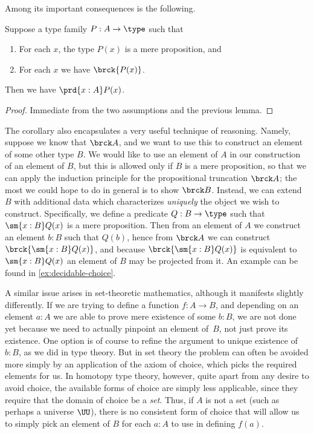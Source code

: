 Among its important consequences is the following.

\begin{cor}\label{cor:UC}
  Suppose a type family $P:A\to \type$ such that
  \begin{enumerate}
  \item For each $x$, the type $P(x)$ is a mere proposition, and
  \item For each $x$ we have $\brck {P(x)}$.
  \end{enumerate}
  Then we have $\prd{x:A} P(x)$.
\end{cor}
\begin{proof}
  Immediate from the two assumptions and the previous lemma.
\end{proof}

The corollary also encapsulates a very useful technique of reasoning.
Namely, suppose we know that $\brck A$, and we want to use this to construct an element of some other type $B$.
We would like to use an element of $A$ in our construction of an element of $B$, but this is allowed only if $B$ is a mere proposition, so that we can apply the induction principle for the propositional truncation $\brck A$; the most we could hope to do in general is to show $\brck B$.
%
Instead, we can extend $B$ with additional data which characterizes \emph{uniquely} the object we wish to construct.
Specifically, we define a predicate $Q:B\to\type$ such that $\sm{x:B} Q(x)$ is a mere proposition.
Then from an element of $A$ we construct an element $b:B$ such that $Q(b)$, hence from $\brck A$ we can construct $\brck{\sm{x:B} Q(x)}$, and because $\brck{\sm{x:B} Q(x)}$ is equivalent to $\sm{x:B} Q(x)$ an element of $B$ may be projected from it.
An example can be found in \cref{ex:decidable-choice}.

A similar issue arises in set-theoretic mathematics, although it manifests slightly
differently. If we are trying to define a function $f: A \to B$, and depending on an
element $a : A$ we are able to prove mere existence of some $b : B$, we are not done yet
because we need to actually pinpoint an element of~$B$, not just prove its existence.
One option is of course to refine the argument to unique existence of $b : B$, as we did in type theory. But in set theory the problem can often be avoided more simply by an application of the axiom of choice, which picks the required elements for us.
In homotopy type theory, however, quite apart from any desire to avoid choice, the available forms of choice are simply less applicable, since they require that the domain of choice be a \emph{set}.
Thus, if $A$ is not a set (such as perhaps a universe $\UU$), there is no consistent form of choice that will allow us to simply pick an element of $B$ for each $a : A$ to use in defining $f(a)$.

